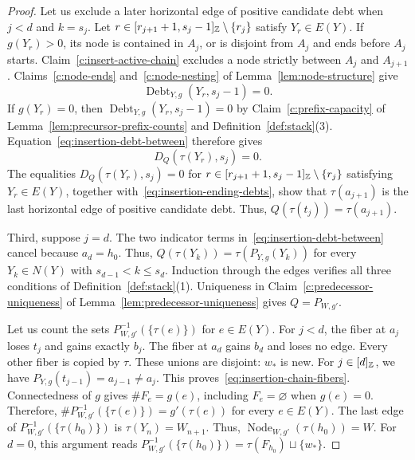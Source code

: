 \begin{proof}
Let us exclude a later horizontal edge of positive candidate debt when $j<d$ and $k=s_j$.
Let $r\in[r_{j+1}+1,s_j-1]_{\mathbb Z}\setminus\{r_j\}$ satisfy $Y_r\in E(Y)$.
If $g(Y_r)>0$, its node is contained in $A_j$, or is disjoint from $A_j$ and ends before $A_j$ starts.
Claim~\ref{c:insert-active-chain} excludes a node strictly between $A_j$ and $A_{j+1}$.
Claims~\ref{c:node-ends} and~\ref{c:node-nesting} of Lemma~\ref{lem:node-structure} give
\[
 \operatorname{Debt}_{Y,g}(Y_r,s_j-1)=0.
\]
If $g(Y_r)=0$, then $\operatorname{Debt}_{Y,g}(Y_r,s_j-1)=0$ by Claim~\ref{c:prefix-capacity} of Lemma~\ref{lem:precursor-prefix-counts} and Definition~\ref{def:stack}(3).
Equation~\eqref{eq:insertion-debt-between} therefore gives
\[
 D_Q(\tau(Y_r),s_j)=0.
\]
The equalities $D_Q(\tau(Y_r),s_j)=0$ for $r\in[r_{j+1}+1,s_j-1]_{\mathbb Z}\setminus\{r_j\}$ satisfying $Y_r\in E(Y)$, together with~\eqref{eq:insertion-ending-debts}, show that
$\tau(a_{j+1})$ is the last horizontal edge of positive candidate debt.
Thus, $Q(\tau(t_j))=\tau(a_{j+1})$.

Third, suppose $j=d$. The two indicator terms in~\eqref{eq:insertion-debt-between} cancel because $a_d=h_0$. Thus, $Q(\tau(Y_k))=\tau(P_{Y,g}(Y_k))$ for every $Y_k\in N(Y)$ with $s_{d-1}<k\le s_d$. Induction through the edges verifies all three conditions of Definition~\ref{def:stack}(1). Uniqueness in Claim~\ref{c:predecessor-uniqueness} of Lemma~\ref{lem:predecessor-uniqueness} gives $Q=P_{W,g'}$.

 Let us count the sets $P_{W,g'}^{-1}(\{\tau(e)\})$ for $e\in E(Y)$. For $j<d$, the fiber at $a_j$ loses $t_j$ and gains exactly $b_j$. The fiber at $a_d$ gains $b_d$ and loses no edge. Every other fiber is copied by $\tau$. These unions are disjoint: $w_*$ is new. For $j\in[d]_{\mathbb Z}$, we have $P_{Y,g}(t_{j-1})=a_{j-1}\ne a_j$. This proves~\eqref{eq:insertion-chain-fibers}. Connectedness of $g$ gives $\#F_e=g(e)$, including $F_e=\varnothing$ when $g(e)=0$. Therefore, $\#P_{W,g'}^{-1}(\{\tau(e)\})=g'(\tau(e))$ for every $e\in E(Y)$. The last edge of $P_{W,g'}^{-1}(\{\tau(h_0)\})$ is $\tau(Y_n)=W_{n+1}$. Thus, $\operatorname{Node}_{W,g'}(\tau(h_0))=W$. For $d=0$, this argument reads $P_{W,g'}^{-1}(\{\tau(h_0)\})=\tau(F_{h_0})\sqcup\{w_*\}$.
\end{proof}

